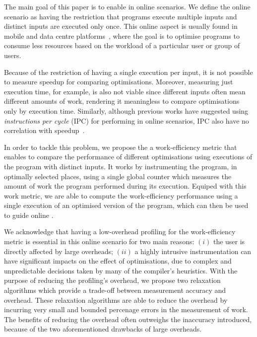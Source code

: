 The main goal of this paper is to enable {\itercomp} in online scenarios.
We define the online scenario as having the restriction that programs execute
multiple inputs and distinct inputs are executed only once.
This online aspect is usually found in mobile and data centre
platforms~\citep{chen12b,fang15,mpeis16}, where the goal is to optimise programs
to consume less resources based on the workload of a particular user or group of
users.

Because of the restriction of having a single execution per input, it is not
possible to measure speedup for comparing optimisations.
Moreover, measuring just execution time, for example, is also not viable since
different inputs often mean different amounts of work,
rendering it meaningless to compare optimisations only by execution time.
Similarly, although previous works have suggested using
\textit{instructions per cycle} (IPC) for performing {\itercomp} in online
scenarios, IPC also have no correlation with speedup~\citep{fursin07}.

In order to tackle this problem, we propose the a work-efficiency metric that
enables to compare the performance of different optimisations using executions
of the program with distinct inputs.
It works by instrumenting the program, in optimally selected places, using a
single global counter which measures the amount of work the program performed
during its execution.
Equiped with this work metric, we are able to compute the work-efficiency
performance using a single execution of an optimised version of the program,
which can then be used to guide online {\itercomp}.

We acknowledge that having a low-overhead profiling for the work-efficiency
metric is essential in this online scenario for two main reasons:
$(i)$ the user is directly affected by large overheads;
$(ii)$ a highly intrusive instrumentation can have significant impacts on the
effect of optimisations, due to complex and unpredictable decisions taken by
many of the compiler's heuristics.
With the purpose of reducing the profiling's overhead, we propose two relaxation
algorithms which provide a trade-off between measurement accuracy and overhead.
These relaxation algorithms are able to reduce the overhead by incurring very
small and bounded percenage errors in the measurement of work.
The benefits of reducing the overhead often outweighs the inaccuracy introduced,
because of the two aforementioned drawbacks of large overheads.

